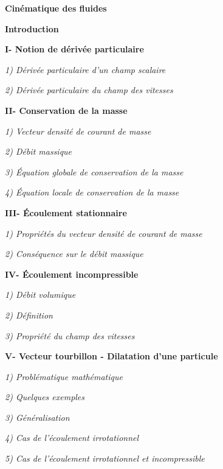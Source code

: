 \documentclass[11pt,a4paper]{article}
\begin{document}
{\fontsize{27}{31}\selectfont\bfseries Cinématique des fluides\par}
\begingroup
\setlength{\parskip}{2pt}
\smallskip
\textbf{Introduction}\par
\medskip\textbf{I- Notion de dérivée particulaire}\par
\hspace*{10mm}\textit{1) Dérivée particulaire d'un champ scalaire}\par
\hspace*{10mm}\textit{2) Dérivée particulaire du champ des vitesses}\par
\medskip\textbf{II- Conservation de la masse}\par
\hspace*{10mm}\textit{1) Vecteur densité de courant de masse}\par
\hspace*{10mm}\textit{2) Débit massique}\par
\hspace*{10mm}\textit{3) Équation globale de conservation de la masse}\par
\hspace*{10mm}\textit{4) Équation locale de conservation de la masse}\par
\medskip\textbf{III- Écoulement stationnaire}\par
\hspace*{10mm}\textit{1) Propriétés du vecteur densité de courant de masse}\par
\hspace*{10mm}\textit{2) Conséquence sur le débit massique}\par
\medskip\textbf{IV- Écoulement incompressible}\par
\hspace*{10mm}\textit{1) Débit volumique}\par
\hspace*{10mm}\textit{2) Définition}\par
\hspace*{10mm}\textit{3) Propriété du champ des vitesses}\par
\medskip\textbf{V- Vecteur tourbillon - Dilatation d'une particule}\par
\hspace*{10mm}\textit{1) Problématique mathématique}\par
\hspace*{10mm}\textit{2) Quelques exemples}\par
\hspace*{10mm}\textit{3) Généralisation}\par
\hspace*{10mm}\textit{4) Cas de l'écoulement irrotationnel}\par
\hspace*{10mm}\textit{5) Cas de l'écoulement irrotationnel et incompressible}\par
\endgroup
\end{document}
